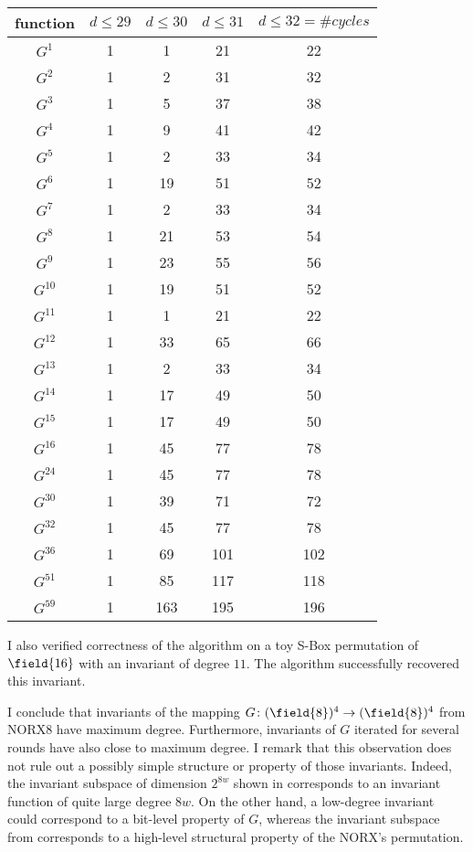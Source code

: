 \begin{table}[ht]
    \centering
    \begin{tabular}{c|cccc}
    \toprule
    
    function & $d\le{29}$ & $d\le{30}$ & $d\le{31}$ & $d\le{32}=\#cycles$\\
    
    \midrule
    
$G^{1}$ & 1 & 1 & 21 & 22 \\
$G^{2}$ & 1 & 2 & 31 & 32 \\
$G^{3}$ & 1 & 5 & 37 & 38 \\
$G^{4}$ & 1 & 9 & 41 & 42 \\
$G^{5}$ & 1 & 2 & 33 & 34 \\
$G^{6}$ & 1 & 19 & 51 & 52 \\
$G^{7}$ & 1 & 2 & 33 & 34 \\
$G^{8}$ & 1 & 21 & 53 & 54 \\
$G^{9}$ & 1 & 23 & 55 & 56 \\
$G^{10}$ & 1 & 19 & 51 & 52 \\
$G^{11}$ & 1 & 1 & 21 & 22 \\
$G^{12}$ & 1 & 33 & 65 & 66 \\
$G^{13}$ & 1 & 2 & 33 & 34 \\
$G^{14}$ & 1 & 17 & 49 & 50 \\
$G^{15}$ & 1 & 17 & 49 & 50 \\
$G^{16}$ & 1 & 45 & 77 & 78 \\
$G^{24}$ & 1 & 45 & 77 & 78 \\
$G^{30}$ & 1 & 39 & 71 & 72 \\
$G^{32}$ & 1 & 45 & 77 & 78 \\
$G^{36}$ & 1 & 69 & 101 & 102 \\
$G^{51}$ & 1 & 85 & 117 & 118 \\
$G^{59}$ & 1 & 163 & 195 & 196 \\

    \bottomrule
    \end{tabular}
\end{table}

I also verified correctness of the algorithm on a toy S-Box permutation of $\field{16}$ with an invariant of degree $11$. The algorithm successfully recovered this invariant.

I conclude that invariants of the mapping $G\colon (\field{8})^4 \to (\field{8})^4$ from NORX8 have maximum degree. Furthermore, invariants of $G$ iterated for several rounds have also close to maximum degree. I remark that this observation does not rule out a possibly simple structure or property of those invariants. Indeed, the invariant subspace of dimension $2^{8w}$ shown in  corresponds to an invariant function of quite large degree $8w$. On the other hand, a low-degree invariant could correspond to a bit-level property of $G$, whereas the invariant subspace from  corresponds to a high-level structural property of the NORX's permutation.